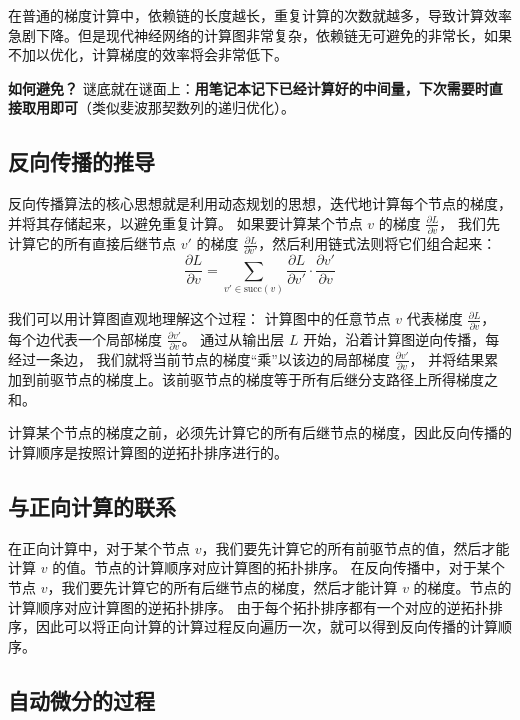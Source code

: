 \documentclass[11pt]{article}%
\begin{document}
    在普通的梯度计算中，依赖链的长度越长，重复计算的次数就越多，导致计算效率急剧下降。但是现代神经网络的计算图非常复杂，依赖链无可避免的非常长，如果不加以优化，计算梯度的效率将会非常低下。

    \textbf{如何避免？} 谜底就在谜面上：\textbf{用笔记本记下已经计算好的中间量，下次需要时直接取用即可}（类似斐波那契数列的递归优化）。

    \subsection{反向传播的推导}

    反向传播算法的核心思想就是利用动态规划的思想，迭代地计算每个节点的梯度，并将其存储起来，以避免重复计算。
    如果要计算某个节点 $v$ 的梯度 $\frac{\partial L}{\partial v}$，
    我们先计算它的所有直接后继节点 $v'$ 的梯度 $\frac{\partial L}{\partial v'}$，然后利用链式法则将它们组合起来： 
    \begin{equation*}
        \frac{\partial L}{\partial v} = \sum_{v' \in \text{succ}(v)} \frac{\partial L}{\partial v'} \cdot \frac{\partial v'}{\partial v}
    \end{equation*}
    
    我们可以用计算图直观地理解这个过程：
    计算图中的任意节点 $v$ 代表梯度 $\frac{\partial L}{\partial v}$，
    每个边代表一个局部梯度 $\frac{\partial v'}{\partial v}$。
    通过从输出层 $L$ 开始，沿着计算图逆向传播，每经过一条边，
    我们就将当前节点的梯度“乘”以该边的局部梯度 $ \frac{\partial v'}{\partial v}$，
    并将结果累加到前驱节点的梯度上。该前驱节点的梯度等于所有后继分支路径上所得梯度之和。

    计算某个节点的梯度之前，必须先计算它的所有后继节点的梯度，因此反向传播的计算顺序是按照计算图的逆拓扑排序进行的。

    \subsection{与正向计算的联系}

    在正向计算中，对于某个节点 $v$，我们要先计算它的所有前驱节点的值，然后才能计算 $v$ 的值。节点的计算顺序对应计算图的拓扑排序。
    在反向传播中，对于某个节点 $v$，我们要先计算它的所有后继节点的梯度，然后才能计算 $v$ 的梯度。节点的计算顺序对应计算图的逆拓扑排序。
    由于每个拓扑排序都有一个对应的逆拓扑排序，因此可以将正向计算的计算过程反向遍历一次，就可以得到反向传播的计算顺序。

    \subsection{自动微分的过程}
\end{document}

